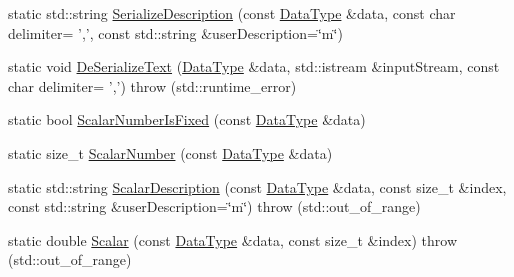 \begin{DoxyCompactItemize}
\item 
static std\-::string \hyperlink{classcmn_data_3_01vct_fixed_size_matrix_3_01__element_type_00_01__rows_00_01__cols_00_01__row_major_01_4_01_4_acfc18a178f20a66080efa93b462a84e1}{Serialize\-Description} (const \hyperlink{classcmn_data_3_01vct_fixed_size_matrix_3_01__element_type_00_01__rows_00_01__cols_00_01__row_major_01_4_01_4_a6b06110fd1bb7049b72ce21275dd8aee}{Data\-Type} \&data, const char delimiter= ',', const std\-::string \&user\-Description=\char`\"{}m\char`\"{})
\item 
static void \hyperlink{classcmn_data_3_01vct_fixed_size_matrix_3_01__element_type_00_01__rows_00_01__cols_00_01__row_major_01_4_01_4_ac1b8d6ae710ee2c4c639beac5cfbba29}{De\-Serialize\-Text} (\hyperlink{classcmn_data_3_01vct_fixed_size_matrix_3_01__element_type_00_01__rows_00_01__cols_00_01__row_major_01_4_01_4_a6b06110fd1bb7049b72ce21275dd8aee}{Data\-Type} \&data, std\-::istream \&input\-Stream, const char delimiter= ',')  throw (std\-::runtime\-\_\-error)
\item 
static bool \hyperlink{classcmn_data_3_01vct_fixed_size_matrix_3_01__element_type_00_01__rows_00_01__cols_00_01__row_major_01_4_01_4_a590d2f67a86980fc56360b18015b43de}{Scalar\-Number\-Is\-Fixed} (const \hyperlink{classcmn_data_3_01vct_fixed_size_matrix_3_01__element_type_00_01__rows_00_01__cols_00_01__row_major_01_4_01_4_a6b06110fd1bb7049b72ce21275dd8aee}{Data\-Type} \&data)
\item 
static size\-\_\-t \hyperlink{classcmn_data_3_01vct_fixed_size_matrix_3_01__element_type_00_01__rows_00_01__cols_00_01__row_major_01_4_01_4_a3e8c4121814f1969d87e7117e4b4b7d7}{Scalar\-Number} (const \hyperlink{classcmn_data_3_01vct_fixed_size_matrix_3_01__element_type_00_01__rows_00_01__cols_00_01__row_major_01_4_01_4_a6b06110fd1bb7049b72ce21275dd8aee}{Data\-Type} \&data)
\item 
static std\-::string \hyperlink{classcmn_data_3_01vct_fixed_size_matrix_3_01__element_type_00_01__rows_00_01__cols_00_01__row_major_01_4_01_4_a663cae5c86cbea6d91b0531e721a8ab6}{Scalar\-Description} (const \hyperlink{classcmn_data_3_01vct_fixed_size_matrix_3_01__element_type_00_01__rows_00_01__cols_00_01__row_major_01_4_01_4_a6b06110fd1bb7049b72ce21275dd8aee}{Data\-Type} \&data, const size\-\_\-t \&index, const std\-::string \&user\-Description=\char`\"{}m\char`\"{})  throw (std\-::out\-\_\-of\-\_\-range)
\item 
static double \hyperlink{classcmn_data_3_01vct_fixed_size_matrix_3_01__element_type_00_01__rows_00_01__cols_00_01__row_major_01_4_01_4_a48e57341b50b85d875d80061fffc266d}{Scalar} (const \hyperlink{classcmn_data_3_01vct_fixed_size_matrix_3_01__element_type_00_01__rows_00_01__cols_00_01__row_major_01_4_01_4_a6b06110fd1bb7049b72ce21275dd8aee}{Data\-Type} \&data, const size\-\_\-t \&index)  throw (std\-::out\-\_\-of\-\_\-range)
\end{DoxyCompactItemize}


